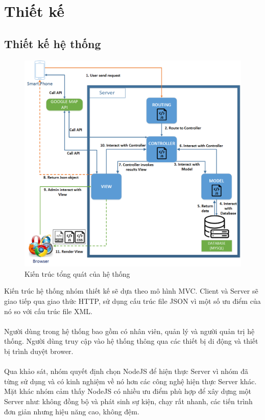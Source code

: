\documentclass[a4paper]{article}
\begin{document}
\newpage
\section{Thiết kế}
\subsection{Thiết kế hệ thống}
\begin{figure}[h]
    \includegraphics[scale=0.5]{architecture}
    \centering
    \caption{Kiến trúc tổng quát của hệ thống}
    \label{fig:architecture}
\end{figure}
\noindent
Kiến trúc hệ thống nhóm thiết kế sẽ dựa theo mô hình MVC. Client và Server sẽ giao tiếp qua giao thức HTTP, sử dụng cấu trúc file JSON vì một số ưu điểm của nó so với cấu trúc file XML.\\
\\
Người dùng trong hệ thống bao gồm có nhân viên, quản lý và người quản trị hệ  thống. Người dùng truy cập vào hệ thống thông qua các thiết bị di động và thiết bị trình duyệt brower.\\
\\
Qua khảo sát, nhóm quyết định chọn NodeJS để hiện thực Server vì nhóm đã từng sử dụng và có kinh nghiệm về nó hơn các công nghệ hiện thực Server khác. Mặt khác nhóm cảm thấy NodeJS có nhiều ưu điểm phù hợp để xây dựng một Server như: không đồng bộ và phát sinh sự kiện, chạy rất nhanh, các tiến trình đơn giản nhưng hiệu năng cao, không đệm.\\
\end{document}
